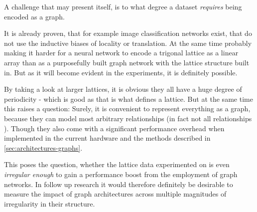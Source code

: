 A challenge that may present itself, is to what degree a dataset \emph{requires} being encoded as a graph.

It is already proven, that for example image classification networks exist, that do not use the inductive biases of locality or translation. 
At the same time probably making it harder for a neural network to encode a trigonal lattice as a linear array than as a purposefully built graph network with the lattice structure built in.
But as it will become evident in the experiments, it is definitely possible. 

By taking a look at larger lattices, it is obvious they all have a huge degree of periodicity - which is good as that is what defines a lattice.
But at the same time this raises a question: Surely, it is convenient to represent everything as a graph, because they can model most arbitrary relationships (in fact not all relationships \cite{relationalInductiveBiasesAndGraphNetworks}). 
Though they also come with a significant performance overhead when implemented in the current hardware and the methods described in \autoref{sec:architectures-graphs}. 

This poses the question, whether the lattice data experimented on is even \emph{irregular enough} to gain a performance boost from the employment of graph networks.
In follow up research it would therefore definitely be desirable to measure the impact of graph architectures across multiple magnitudes of \glqq irregularity\grqq{} in their structure.
